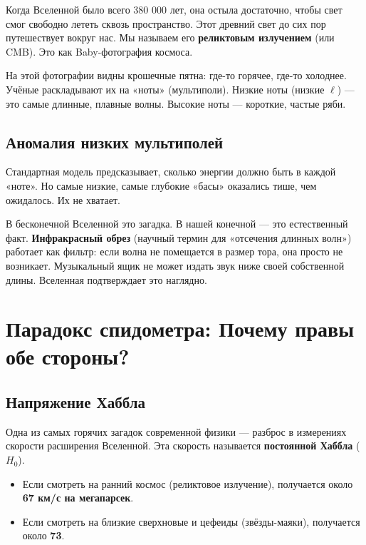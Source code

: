 \documentclass[12pt,a4paper,oneside]{book}
\begin{document}
Когда Вселенной было всего 380 000 лет, она остыла достаточно, чтобы свет смог свободно лететь сквозь пространство. Этот древний свет до сих пор путешествует вокруг нас. Мы называем его \textbf{реликтовым излучением} (или CMB). Это как Baby-фотография космоса.

На этой фотографии видны крошечные пятна: где-то горячее, где-то холоднее. Учёные раскладывают их на «ноты» (мультиполи). Низкие ноты (низкие $\ell$) — это самые длинные, плавные волны. Высокие ноты — короткие, частые ряби.

\section{Аномалия низких мультиполей}

Стандартная модель предсказывает, сколько энергии должно быть в каждой «ноте». Но самые низкие, самые глубокие «басы» оказались тише, чем ожидалось. Их не хватает.

В бесконечной Вселенной это загадка. В нашей конечной — это естественный факт. \textbf{Инфракрасный обрез} (научный термин для «отсечения длинных волн») работает как фильтр: если волна не помещается в размер тора, она просто не возникает. Музыкальный ящик не может издать звук ниже своей собственной длины. Вселенная подтверждает это наглядно.

\chapter{Парадокс спидометра: Почему правы обе стороны?}

\section{Напряжение Хаббла}

Одна из самых горячих загадок современной физики — разброс в измерениях скорости расширения Вселенной. Эта скорость называется \textbf{постоянной Хаббла} ($H_0$).

\begin{itemize}
    \item Если смотреть на ранний космос (реликтовое излучение), получается около \textbf{67 км/с на мегапарсек}.
    \item Если смотреть на близкие сверхновые и цефеиды (звёзды-маяки), получается около \textbf{73}.
\end{itemize}
\end{document}
